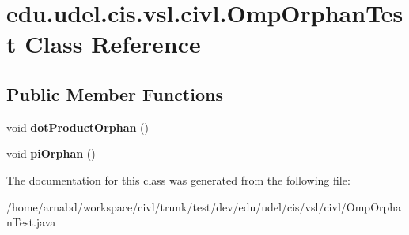 \hypertarget{classedu_1_1udel_1_1cis_1_1vsl_1_1civl_1_1OmpOrphanTest}{}\section{edu.\+udel.\+cis.\+vsl.\+civl.\+Omp\+Orphan\+Test Class Reference}
\label{classedu_1_1udel_1_1cis_1_1vsl_1_1civl_1_1OmpOrphanTest}
\subsection*{Public Member Functions}
\begin{DoxyCompactItemize}
\item 
\hypertarget{classedu_1_1udel_1_1cis_1_1vsl_1_1civl_1_1OmpOrphanTest_aa16a801d92895b8b69fe2879ab31dcd7}{}void {\bfseries dot\+Product\+Orphan} ()\label{classedu_1_1udel_1_1cis_1_1vsl_1_1civl_1_1OmpOrphanTest_aa16a801d92895b8b69fe2879ab31dcd7}

\item 
\hypertarget{classedu_1_1udel_1_1cis_1_1vsl_1_1civl_1_1OmpOrphanTest_a60fb9f7d2f312f819ca78bc1dfa101db}{}void {\bfseries pi\+Orphan} ()\label{classedu_1_1udel_1_1cis_1_1vsl_1_1civl_1_1OmpOrphanTest_a60fb9f7d2f312f819ca78bc1dfa101db}

\end{DoxyCompactItemize}


The documentation for this class was generated from the following file\+:\begin{DoxyCompactItemize}
\item 
/home/arnabd/workspace/civl/trunk/test/dev/edu/udel/cis/vsl/civl/Omp\+Orphan\+Test.\+java\end{DoxyCompactItemize}
